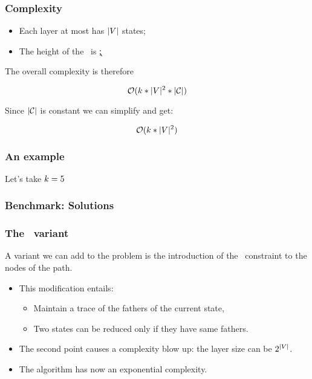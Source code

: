 \begin{frame}
  \frametitle{Complexity}

  \begin{itemize}
    \item Each layer at most has $| V |$ states;
    \item The height of the \mdd\ is \k;
  \end{itemize}

  The overall complexity is therefore
  \begin{center}
    \alert{$$\mathcal{O}(k * | V | ^ 2 * | \mathcal{C} |)$$}
  \end{center}

  \mysep{}

  Since $|\mathcal{C}|$ is constant we can simplify and get:

  \begin{center}
    \alert{$$\mathcal{O}(k * | V | ^ 2) $$}
  \end{center}


\end{frame}

\begin{frame}
  \frametitle{An example}

  

  Let's take $k = 5$

\end{frame}

\begin{frame}
  \frametitle{Benchmark: Solutions}


\end{frame}

\begin{frame}
  \frametitle{The \alldiff\ variant}

  A variant we can add to the problem is the introduction of the \alldiff\ constraint to the nodes of the path.

  \begin{itemize}
    \item This modification entails:
          \begin{itemize}
            \item Maintain a trace of the fathers of the current state,
            \item Two states can be reduced only if they have same fathers.
          \end{itemize}
    \item The second point causes a complexity blow up: the layer size can be $2^{|V|}$.
    \item The algorithm has now an exponential complexity.
  \end{itemize}

\end{frame}